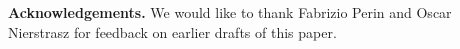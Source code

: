 \documentclass[preprint,12pt]{elsarticle}
\begin{document}
\vspace{0.5cm}
\footnotesize
{\bf Acknowledgements.} We would like to thank Fabrizio Perin and Oscar Nierstrasz for feedback on earlier drafts of this paper.



\newpage

\footnotesize













\end{document}
